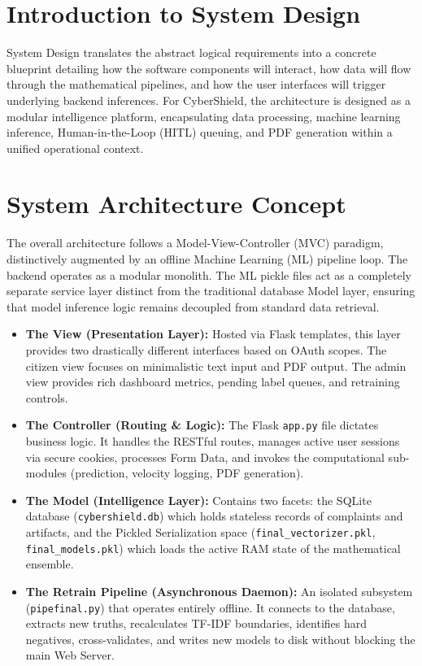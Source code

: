 \section{Introduction to System Design}
System Design translates the abstract logical requirements into a concrete blueprint detailing how the software components will interact, how data will flow through the mathematical pipelines, and how the user interfaces will trigger underlying backend inferences. For CyberShield, the architecture is designed as a modular intelligence platform, encapsulating data processing, machine learning inference, Human-in-the-Loop (HITL) queuing, and PDF generation within a unified operational context.

\section{System Architecture Concept}
The overall architecture follows a Model-View-Controller (MVC) paradigm, distinctively augmented by an offline Machine Learning (ML) pipeline loop. The backend operates as a modular monolith. The ML pickle files act as a completely separate service layer distinct from the traditional database Model layer, ensuring that model inference logic remains decoupled from standard data retrieval.

\begin{itemize}
    \item \textbf{The View (Presentation Layer):} Hosted via Flask templates, this layer provides two drastically different interfaces based on OAuth scopes. The citizen view focuses on minimalistic text input and PDF output. The admin view provides rich dashboard metrics, pending label queues, and retraining controls.
    \item \textbf{The Controller (Routing \& Logic):} The Flask \texttt{app.py} file dictates business logic. It handles the RESTful routes, manages active user sessions via secure cookies, processes Form Data, and invokes the computational sub-modules (prediction, velocity logging, PDF generation).
    \item \textbf{The Model (Intelligence Layer):} Contains two facets: the SQLite database (\texttt{cybershield.db}) which holds stateless records of complaints and artifacts, and the Pickled Serialization space (\texttt{final\_vectorizer.pkl}, \texttt{final\_models.pkl}) which loads the active RAM state of the mathematical ensemble.
    \item \textbf{The Retrain Pipeline (Asynchronous Daemon):} An isolated subsystem (\texttt{pipefinal.py}) that operates entirely offline. It connects to the database, extracts new truths, recalculates TF-IDF boundaries, identifies hard negatives, cross-validates, and writes new models to disk without blocking the main Web Server.
\end{itemize}

